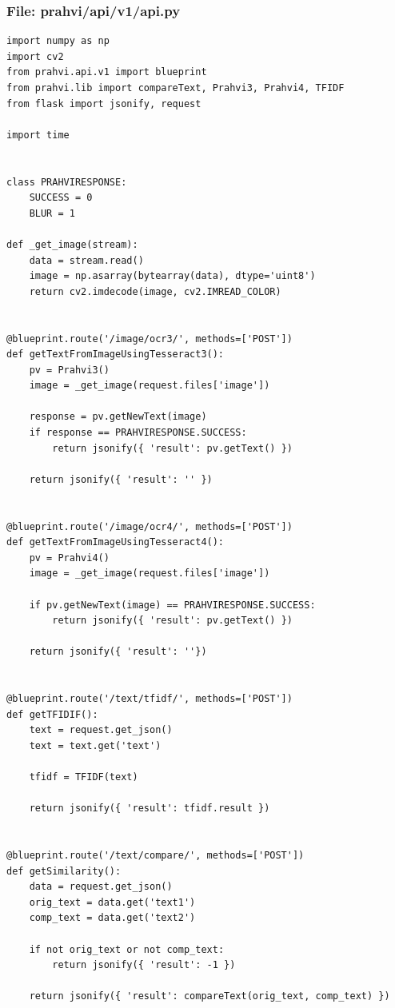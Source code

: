 \subsubsection{File: prahvi/api/v1/api.py}
\begin{lstlisting}
import numpy as np
import cv2
from prahvi.api.v1 import blueprint 
from prahvi.lib import compareText, Prahvi3, Prahvi4, TFIDF
from flask import jsonify, request

import time


class PRAHVIRESPONSE:
    SUCCESS = 0
    BLUR = 1

def _get_image(stream):
    data = stream.read()
    image = np.asarray(bytearray(data), dtype='uint8')
    return cv2.imdecode(image, cv2.IMREAD_COLOR)


@blueprint.route('/image/ocr3/', methods=['POST'])
def getTextFromImageUsingTesseract3():
    pv = Prahvi3()
    image = _get_image(request.files['image'])

    response = pv.getNewText(image)
    if response == PRAHVIRESPONSE.SUCCESS:
        return jsonify({ 'result': pv.getText() })

    return jsonify({ 'result': '' })


@blueprint.route('/image/ocr4/', methods=['POST'])
def getTextFromImageUsingTesseract4():
    pv = Prahvi4()
    image = _get_image(request.files['image'])
    
    if pv.getNewText(image) == PRAHVIRESPONSE.SUCCESS:
        return jsonify({ 'result': pv.getText() })

    return jsonify({ 'result': ''})


@blueprint.route('/text/tfidf/', methods=['POST'])
def getTFIDIF():
    text = request.get_json() 
    text = text.get('text')

    tfidf = TFIDF(text)

    return jsonify({ 'result': tfidf.result })


@blueprint.route('/text/compare/', methods=['POST'])
def getSimilarity():
    data = request.get_json()
    orig_text = data.get('text1')
    comp_text = data.get('text2') 

    if not orig_text or not comp_text:
        return jsonify({ 'result': -1 })

    return jsonify({ 'result': compareText(orig_text, comp_text) })
\end{lstlisting}

